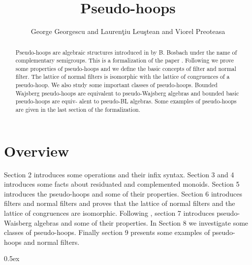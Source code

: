 \documentclass[11pt,a4paper]{article}
\begin{document}
\title{Pseudo-hoops}

\author{George Georgescu and Lauren\c tiu Leu\c stean and Viorel Preoteasa}

\maketitle

\begin{abstract}
Pseudo-hoops are algebraic structures introduced in \cite{bosbach:1969,bosbach:1970} 
by B. Bosbach under the name of complementary semigroups.
This is a formalization of the paper \cite{georgescu:leustean:preoteasa:2005}.
Following \cite{georgescu:leustean:preoteasa:2005}  we prove some properties 
of pseudo-hoops and we define the basic concepts of filter and normal filter. 
The lattice of normal filters is isomorphic with the lattice of congruences of 
a pseudo-hoop. We also study some important classes of pseudo-hoops. Bounded 
Wajsberg pseudo-hoops are equivalent to pseudo-Wajsberg algebras and bounded 
basic pseudo-hoops are equiv- alent to pseudo-BL algebras. Some examples of 
pseudo-hoops are given in the last section of the formalization.

\end{abstract}

\tableofcontents

\section{Overview}
Section 2 introduces some operations and their infix syntax.
Section 3 and 4 introduces some facts about residuated and complemented monoids.
Section 5 introduces the pseudo-hoops and some of their properties. Section 6
introduces filters and normal filters and proves that the lattice of normal 
filters and the lattice of congruences are isomorphic. Following 
\cite{ceterchi:2001}, section 7 introduces pseudo-Waisberg algebras and 
some of their properties. In Section 8 we investigate some classes of 
pseudo-hoops. Finally section 9 presents some examples of pseudo-hoops and
normal filters.

\parindent 0pt\parskip 0.5ex





\end{document}
